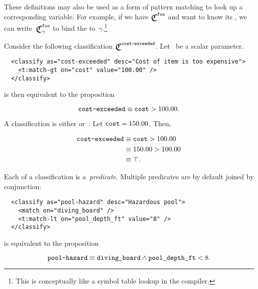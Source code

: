 
These definitions may also be used as a form of pattern matching to look up
  a corresponding variable.
For example,
  if we have $\Classify^\texttt{foo}$ and want to know its ,
    we can write~$\Classify^\texttt{foo}_\gamma$ to bind the
     to~$\gamma$.\footnote{%
      This is conceptually like a symbol table lookup in the compiler.}

Consider the following classification $\Classify^\texttt{cost-exceeded}$.
Let~ be a scalar parameter.

\begin{lstlisting}
  <classify as="cost-exceeded" desc="Cost of item is too expensive">
    <t:match-gt on="cost" value="100.00" />
  </classify>
\end{lstlisting}

\noindent
is then equivalent to the proposition

\begin{equation*}
  \texttt{cost-exceeded} \equiv \texttt{cost} > 100.00.
\end{equation*}

A classification is either \true or~\false.
Let $\texttt{cost}=150.00$.
Then,

\begin{align*}
  \texttt{cost-exceeded} & \equiv \texttt{cost} > 100.00 \\
                            & \equiv 150.00 > 100.00 \\
                            & \equiv \top.
\end{align*}

Each  of a classification is a~\emph{predicate}.
Multiple predicates are by default joined by conjunction:

\begin{lstlisting}
  <classify as="pool-hazard" desc="Hazardous pool">
    <match on="diving_board" />
    <t:match-lt on="pool_depth_ft" value="8" />
  </classify>
\end{lstlisting}

\noindent
is equivalent to the proposition

\begin{equation*}
  \texttt{pool-hazard} \equiv \texttt{diving\_board}
    \land \texttt{pool\_depth\_ft} < 8.
\end{equation*}



